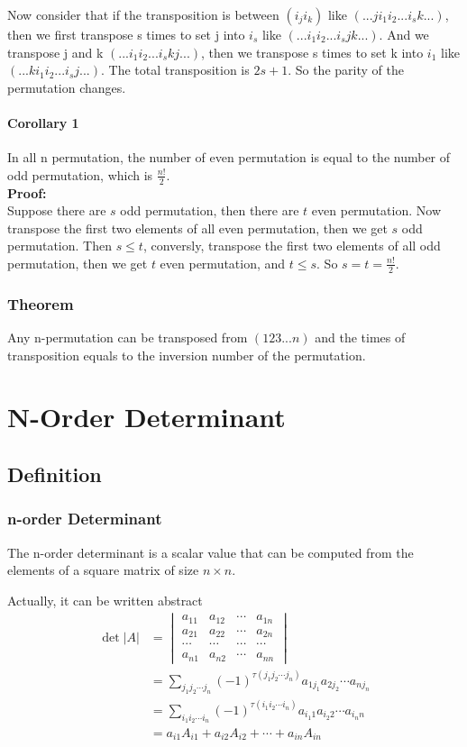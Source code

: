 \documentclass{article}
\theoremstyle{definition}
\begin{document}
Now consider that if the transposition is between $(i_{j}i_{k})$ like 
$(...ji_{1}i_{2}...i_{s}k...)$, 
then we first transpose s times to set j into $i_{s}$ like 
$(...i_{1}i_{2}...i_{s}jk...)$. 
And we transpose j and k 
$(...i_{1}i_{2}...i_{s}kj...)$, 
then we transpose s times to set k into $i_{1}$ like 
$(...ki_{1}i_{2}...i_{s}j...)$.
The total transposition is $2s+1$. 
So the parity of the permutation changes.

\paragraph{Corollary 1}
In all n permutation, the number of even permutation 
is equal to the number of odd permutation, which is 
$\frac{n!}{2}$.\\
\textbf{Proof:}\\
Suppose there are $s$ odd permutation, then there are
$t$ even permutation. Now transpose the first two elements 
of all even permutation, then we get $s$ odd permutation.
Then $s\leq t$, conversly, transpose the first two elements 
of all odd permutation, then we get $t$ even permutation, and 
$t\leq s$. So $s=t=\frac{n!}{2}$.

\subsubsection{Theorem}
Any n-permutation can be transposed from $(123...n)$ and the times 
of transposition equals to the inversion number of the permutation.

\section{N-Order Determinant}
\subsection{Definition}
\subsubsection{n-order Determinant}
The n-order determinant is a scalar value that can be computed from 
the elements of a square matrix of size $n\times n$.

Actually, it can be written abstract
\begin{align*}
\det |A|  
& =
\begin{vmatrix}
    a_{11} & a_{12} & \cdots & a_{1n}\\
    a_{21} & a_{22} & \cdots & a_{2n}\\
    \cdots & \cdots & \cdots & \cdots\\
    a_{n1} & a_{n2} & \cdots & a_{nn}
\end{vmatrix} \\
& = \sum_{j_{1}j_{2}\cdots j_{n}}(-1)^{\tau (j_{1}j_{2}\cdots j_{n})} a_{1j_{1}}a_{2j_{2}}\cdots a_{nj_{n}} \\
& = \sum_{i_{1}i_{2}\cdots i_{n}}(-1)^{\tau (i_{1}i_{2}\cdots i_{n})} a_{i_{1}1}a_{i_{2}2}\cdots a_{i_{n}n} \\
& = a_{i1}A_{i1}+a_{i2}A_{i2}+\cdots+a_{in}A_{in}
\end{align*}
\end{document}
